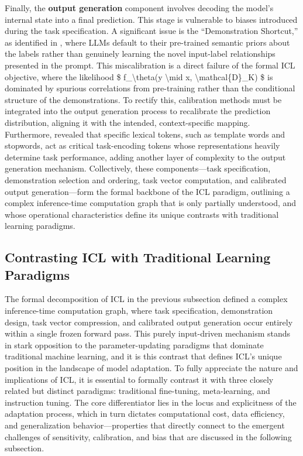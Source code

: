 \documentclass[11pt]{article}
\begin{document}
Finally, the \textbf{output generation} component involves decoding the model's internal state into a final prediction. This stage is vulnerable to biases introduced during the task specification. A significant issue is the ``Demonstration Shortcut,'' as identified in \cite{ref23}, where LLMs default to their pre-trained semantic priors about the labels rather than genuinely learning the novel input-label relationships presented in the prompt. This miscalibration is a direct failure of the formal ICL objective, where the likelihood \$ f\_\textbackslash theta(y \textbackslash mid x, \textbackslash mathcal\{D\}\_K) \$ is dominated by spurious correlations from pre-training rather than the conditional structure of the demonstrations. To rectify this, calibration methods must be integrated into the output generation process to recalibrate the prediction distribution, aligning it with the intended, context-specific mapping. Furthermore, \cite{ref24} revealed that specific lexical tokens, such as template words and stopwords, act as critical task-encoding tokens whose representations heavily determine task performance, adding another layer of complexity to the output generation mechanism. Collectively, these components---task specification, demonstration selection and ordering, task vector computation, and calibrated output generation---form the formal backbone of the ICL paradigm, outlining a complex inference-time computation graph that is only partially understood, and whose operational characteristics define its unique contrasts with traditional learning paradigms.

\subsection{Contrasting ICL with Traditional Learning Paradigms}

The formal decomposition of ICL in the previous subsection defined a complex inference-time computation graph, where task specification, demonstration design, task vector compression, and calibrated output generation occur entirely within a single frozen forward pass. This purely input-driven mechanism stands in stark opposition to the parameter-updating paradigms that dominate traditional machine learning, and it is this contrast that defines ICL's unique position in the landscape of model adaptation. To fully appreciate the nature and implications of ICL, it is essential to formally contrast it with three closely related but distinct paradigms: traditional fine-tuning, meta-learning, and instruction tuning. The core differentiator lies in the locus and explicitness of the adaptation process, which in turn dictates computational cost, data efficiency, and generalization behavior---properties that directly connect to the emergent challenges of sensitivity, calibration, and bias that are discussed in the following subsection.
\end{document}
